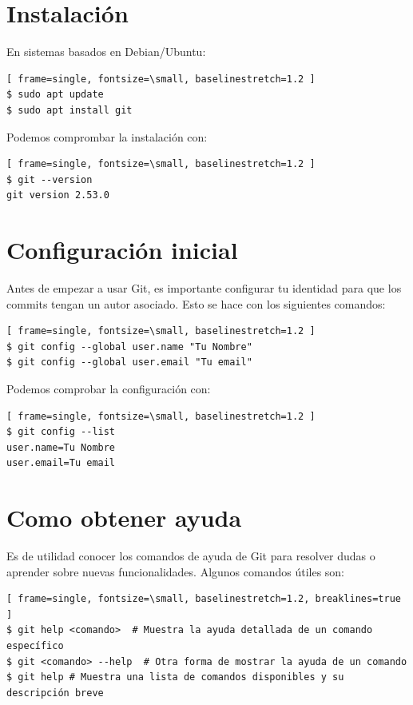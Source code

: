 \documentclass{apuntes_itsv}
\begin{document}
\section{Instalación}

En sistemas basados en Debian/Ubuntu:

\begin{Verbatim}[ frame=single, fontsize=\small, baselinestretch=1.2 ]
$ sudo apt update
$ sudo apt install git
\end{Verbatim}

Podemos comprombar la instalación con:
\begin{Verbatim}[ frame=single, fontsize=\small, baselinestretch=1.2 ]
$ git --version
git version 2.53.0
\end{Verbatim}

\section{Configuración inicial}

Antes de empezar a usar Git, es importante configurar tu identidad para que los commits tengan un autor asociado. Esto se hace con los siguientes comandos:
\begin{Verbatim}[ frame=single, fontsize=\small, baselinestretch=1.2 ]
$ git config --global user.name "Tu Nombre"
$ git config --global user.email "Tu email"
\end{Verbatim}

Podemos comprobar la configuración con:
\begin{Verbatim}[ frame=single, fontsize=\small, baselinestretch=1.2 ]
$ git config --list
user.name=Tu Nombre
user.email=Tu email
\end{Verbatim}

\section{Como obtener ayuda}
Es de utilidad conocer los comandos de ayuda de Git para resolver dudas o aprender sobre nuevas funcionalidades. Algunos comandos útiles son:
\begin{Verbatim}[ frame=single, fontsize=\small, baselinestretch=1.2, breaklines=true ]
$ git help <comando>  # Muestra la ayuda detallada de un comando específico
$ git <comando> --help  # Otra forma de mostrar la ayuda de un comando
$ git help # Muestra una lista de comandos disponibles y su descripción breve 
\end{Verbatim}
\end{document}
